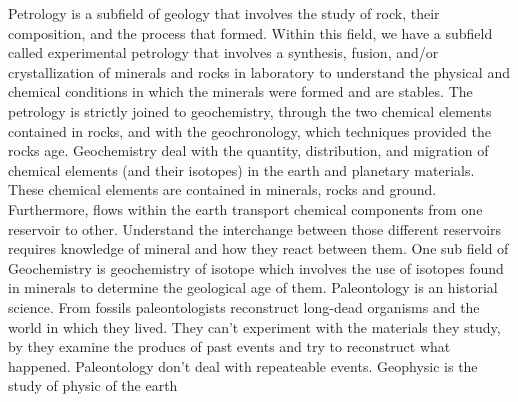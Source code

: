 Petrology is a subfield of geology that involves the study of rock, their composition, and the process that formed. Within this field, we have a subfield called experimental petrology that involves  a synthesis, fusion, and/or crystallization of minerals and rocks in  laboratory to understand the physical and chemical conditions in which the minerals were formed and are stables. The petrology is strictly joined to geochemistry, through the two chemical elements contained in rocks, and with the geochronology, which techniques provided the rocks age.  Geochemistry deal with the quantity, distribution, and migration of chemical elements (and their isotopes) in the earth and planetary materials. These chemical elements are contained in minerals, rocks and ground. Furthermore, flows within the earth transport chemical components from one reservoir to other. Understand the interchange between those different reservoirs requires knowledge of  mineral and how they react between them. One sub field of Geochemistry is geochemistry of isotope which involves the use of isotopes found in minerals to determine the geological age of them. 
Paleontology \cite{stearn:1989} is an historial science. From fossils paleontologists reconstruct long-dead organisms and the world in which they lived. They can’t experiment with the materials they study, by they examine the producs of past events and try to reconstruct what happened.  Paleontology don't deal with repeateable events.
Geophysic is the study of physic of the earth